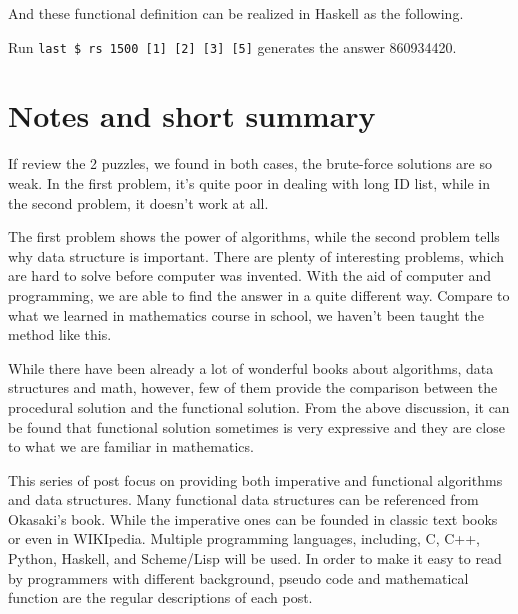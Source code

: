 \documentclass[b5paper]{article}
\begin{document}
And these functional definition can be realized in Haskell as the following.


Run \texttt{last \$ rs 1500 [1] [2] [3] [5]} generates the answer 860934420.

\section{Notes and short summary}
If review the 2 puzzles, we found in both cases, the brute-force solutions
are so weak. In the first problem, it's quite poor in dealing with
long ID list, while in the second problem, it doesn't work at all.

The first problem shows the power of algorithms, while the second
problem tells why data structure is important. There are plenty
of interesting problems, which are hard to solve before computer
was invented. With the aid of computer and programming, we are able
to find the answer in a quite different way. Compare to what we
learned in mathematics course in school, we haven't been taught the method
like this.

While there have been already a lot of wonderful books about
algorithms, data structures and math, however, few of them
provide the comparison between the procedural solution and
the functional solution. From the above discussion, it can be
found that functional solution sometimes is very expressive
and they are close to what we are familiar in mathematics.

This series of post focus on providing both imperative and functional
algorithms and data structures. Many functional data structures
can be referenced from Okasaki's book\cite{okasaki-book}. While
the imperative ones can be founded in classic text books \cite{CLRS}
or even in WIKIpedia.
Multiple
programming languages, including, C, C++, Python, Haskell, and
Scheme/Lisp will be used. In order to make it easy to read
by programmers with different background, pseudo code and mathematical
function are the regular descriptions of each post.
\end{document}
